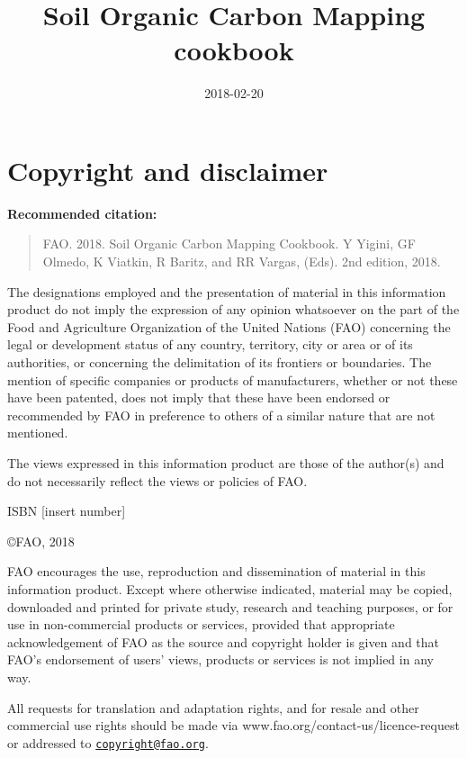 \documentclass[10pt,b5paper,]{book}
\title{Soil Organic Carbon Mapping cookbook}
\author{}
\date{2018-02-20}
\theoremstyle{definition}
\theoremstyle{definition}
\theoremstyle{definition}
\theoremstyle{remark}
\begin{document}
\maketitle



\frontmatter

\hypertarget{copyright-and-disclaimer}{%
\chapter*{Copyright and disclaimer}\label{copyright-and-disclaimer}}

\textbf{Recommended citation:}

\begin{quote}
FAO. 2018. Soil Organic Carbon Mapping Cookbook. Y Yigini, GF Olmedo, K
Viatkin, R Baritz, and RR Vargas, (Eds). 2nd edition, 2018.
\end{quote}

The designations employed and the presentation of material in this
information product do not imply the expression of any opinion
whatsoever on the part of the Food and Agriculture Organization of the
United Nations (FAO) concerning the legal or development status of any
country, territory, city or area or of its authorities, or concerning
the delimitation of its frontiers or boundaries. The mention of specific
companies or products of manufacturers, whether or not these have been
patented, does not imply that these have been endorsed or recommended by
FAO in preference to others of a similar nature that are not mentioned.

The views expressed in this information product are those of the
author(s) and do not necessarily reflect the views or policies of FAO.

ISBN {[}insert number{]}

\copyright FAO, 2018

FAO encourages the use, reproduction and dissemination of material in
this information product. Except where otherwise indicated, material may
be copied, downloaded and printed for private study, research and
teaching purposes, or for use in non-commercial products or services,
provided that appropriate acknowledgement of FAO as the source and
copyright holder is given and that FAO's endorsement of users' views,
products or services is not implied in any way.

All requests for translation and adaptation rights, and for resale and
other commercial use rights should be made via
www.fao.org/contact-us/licence-request or addressed to
\href{mailto:copyright@fao.org}{\nolinkurl{copyright@fao.org}}.
\end{document}
